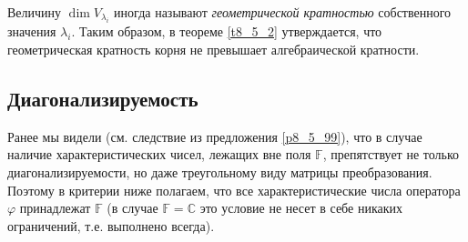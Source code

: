 \otstup

 Величину $\dim V_{\lambda _i}$ иногда называют {\it геометрической кратностью}
собственного значения $\lambda _i$. 
Таким образом, в теореме \ref{t8_5_2} утверждается, что
геометрическая кратность корня не превышает алгебраической кратности.



\subsection{Диагонализируемость}


Ранее мы видели (см. следствие из предложения \ref{p8_5_99}), что 
в случае  наличие характеристических 
чисел, лежащих  вне поля $\mathbb{F}$, 
препятствует не только диагонализируемости, но даже треугольному виду матрицы преобразования.
Поэтому в критерии ниже полагаем, что все характеристические числа оператора $\varphi$
принадлежат $\mathbb{F}$ (в случае $\mathbb{F}=\mathbb{C}$ это условие не несет в себе никаких ограничений,
т.е. выполнено всегда).


